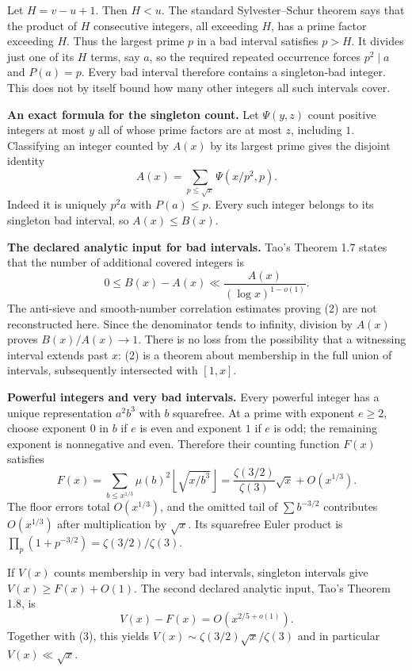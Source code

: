 Let $H=v-u+1$. Then $H<u$. The standard Sylvester--Schur theorem says that the product of $H$ consecutive integers, all exceeding $H$, has a prime factor exceeding $H$. Thus the largest prime $p$ in a bad interval satisfies $p>H$. It divides just one of its $H$ terms, say $a$, so the required repeated occurrence forces $p^2\mid a$ and $P(a)=p$. Every bad interval therefore contains a singleton-bad integer. This does not by itself bound how many other integers all such intervals cover.

\textbf{An exact formula for the singleton count.} Let $\Psi(y,z)$ count positive integers at most $y$ all of whose prime factors are at most $z$, including $1$. Classifying an integer counted by $A(x)$ by its largest prime gives the disjoint identity
\[
A(x)=\sum_{p\leq\sqrt x}\Psi(x/p^2,p).                    \tag{1}
\]
Indeed it is uniquely $p^2a$ with $P(a)\leq p$. Every such integer belongs to its singleton bad interval, so $A(x)\leq B(x)$.

\textbf{The declared analytic input for bad intervals.} Tao's Theorem 1.7 states that the number of additional covered integers is
\[
0\leq B(x)-A(x)\ll\frac{A(x)}{(\log x)^{1-o(1)}}.         \tag{2}
\]
The anti-sieve and smooth-number correlation estimates proving (2) are not reconstructed here. Since the denominator tends to infinity, division by $A(x)$ proves $B(x)/A(x)\to1$. There is no loss from the possibility that a witnessing interval extends past $x$: (2) is a theorem about membership in the full union of intervals, subsequently intersected with $[1,x]$.

\textbf{Powerful integers and very bad intervals.} Every powerful integer has a unique representation $a^2b^3$ with $b$ squarefree. At a prime with exponent $e\geq2$, choose exponent $0$ in $b$ if $e$ is even and exponent $1$ if $e$ is odd; the remaining exponent is nonnegative and even. Therefore their counting function $F(x)$ satisfies
\[
F(x)=\sum_{b\leq x^{1/3}}\mu(b)^2\left\lfloor\sqrt{x/b^3}\right\rfloor
=\frac{\zeta(3/2)}{\zeta(3)}\sqrt x+O(x^{1/3}).           \tag{3}
\]
The floor errors total $O(x^{1/3})$, and the omitted tail of $\sum b^{-3/2}$ contributes $O(x^{1/3})$ after multiplication by $\sqrt x$. Its squarefree Euler product is $\prod_p(1+p^{-3/2})=\zeta(3/2)/\zeta(3)$.

If $V(x)$ counts membership in very bad intervals, singleton intervals give $V(x)\geq F(x)+O(1)$. The second declared analytic input, Tao's Theorem 1.8, is
\[
V(x)-F(x)=O(x^{2/5+o(1)}).
\]
Together with (3), this yields $V(x)\sim\zeta(3/2)\sqrt x/\zeta(3)$ and in particular $V(x)\ll\sqrt x$.

